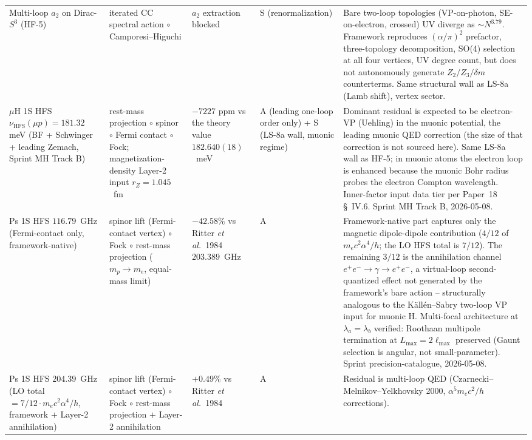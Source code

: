 \documentclass[11pt]{article}
\begin{document}
{\begin{longtable}{p{3.8cm} p{2.5cm} p{1.5cm} p{1.4cm} p{4.5cm}}
Multi-loop $a_2$ on Dirac-$S^3$ (HF-5) & iterated CC spectral action
$\circ$ Camporesi--Higuchi & $a_2$ extraction blocked & S (renormalization)
& Bare two-loop topologies (VP-on-photon, SE-on-electron, crossed) UV
diverge as $\sim N^{3.79}$.  Framework reproduces $(\alpha/\pi)^2$
prefactor, three-topology decomposition, SO(4) selection at all four
vertices, UV degree count, but does not autonomously generate $Z_2/Z_3/
\delta m$ counterterms.  Same structural wall as LS-8a (Lamb shift),
vertex sector. \\
$\mu$H 1S HFS $\nu_\text{HFS}(\mu p) = 181.32$ meV (BF + Schwinger +
leading Zemach, Sprint MH Track B) & rest-mass projection $\circ$
spinor $\circ$ Fermi contact $\circ$ Fock; magnetization-density
Layer-2 input $r_Z = 1.045$~fm & $-7227$ ppm vs the theory value
$182.640(18)$~meV~\cite{hagelstein_lensky_pascalutsa2023} & A (leading one-loop order only) + S (LS-8a wall, muonic regime)
& Dominant residual is expected to be electron-VP (Uehling) in the
muonic potential, the leading muonic QED correction (the size of that
correction is not sourced here).  Same LS-8a wall as HF-5; in
muonic atoms the electron loop is enhanced because the muonic Bohr
radius probes the electron Compton wavelength.  Inner-factor input
data tier per Paper~18 \S~IV.6.  Sprint MH Track B, 2026-05-08. \\
Ps 1S HFS $116.79$~GHz (Fermi-contact only, framework-native) & spinor
lift (Fermi-contact vertex) $\circ$ Fock $\circ$ rest-mass projection
($m_p \to m_e$, equal-mass limit) & $-42.58\%$ vs Ritter \emph{et al.}\ 1984
$203.389$~GHz & A & Framework-native part captures only the magnetic
dipole-dipole contribution ($4/12$ of $m_e c^2 \alpha^4/h$; the LO
HFS total is $7/12$).  The
remaining $3/12$ is the annihilation channel $e^+e^- \to \gamma \to e^+e^-$,
a virtual-loop second-quantized effect not generated by the framework's
bare action -- structurally analogous to the K\"all\'en--Sabry two-loop
VP input for muonic H. Multi-focal architecture at $\lambda_a = \lambda_b$
verified: Roothaan multipole termination at $L_\text{max} = 2 \ell_\text{max}$
preserved (Gaunt selection is angular, not small-parameter).
Sprint precision-catalogue, 2026-05-08. \\
Ps 1S HFS $204.39$~GHz (LO total $= 7/12 \cdot m_e c^2 \alpha^4 / h$,
framework $+$ Layer-2 annihilation) & spinor lift (Fermi-contact vertex)
$\circ$ Fock $\circ$ rest-mass projection $+$ Layer-2 annihilation &
$+0.49\%$ vs Ritter \emph{et al.}\ 1984 & A & Residual is multi-loop QED
(Czarnecki--Melnikov--Yelkhovsky 2000, $\alpha^5 m_e c^2/h$ corrections).

\end{longtable}}
\end{document}
